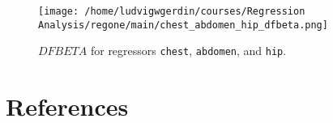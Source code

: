 \documentclass[11pt]{article}
\begin{document}
\begin{figure}[H]
\centering
\texttt{[image: /home/ludvigwgerdin/courses/Regression Analysis/regone/main/chest\_abdomen\_hip\_dfbeta.png]}
\caption{\label{fig:org00853c6}
\(DFBETA\) for regressors \texttt{chest}, \texttt{abdomen}, and \texttt{hip}.}
\end{figure}

\newpage

\section{References}
\label{sec:orgec31821}



\end{document}
